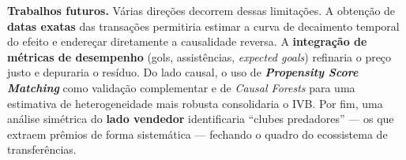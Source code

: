 \textbf{Trabalhos futuros.} Várias direções decorrem dessas limitações. A obtenção de \textbf{datas
exatas} das transações permitiria estimar a curva de decaimento temporal do efeito e endereçar
diretamente a causalidade reversa. A \textbf{integração de métricas de desempenho} (gols,
assistências, \textit{expected goals}) refinaria o preço justo e depuraria o resíduo. Do lado
causal, o uso de \textbf{\textit{Propensity Score Matching}} como validação complementar e de
\textit{Causal Forests} para uma estimativa de heterogeneidade mais robusta consolidaria o IVB.
Por fim, uma análise simétrica do \textbf{lado vendedor} identificaria ``clubes predadores'' — os que
extraem prêmios de forma sistemática — fechando o quadro do ecossistema de transferências.
